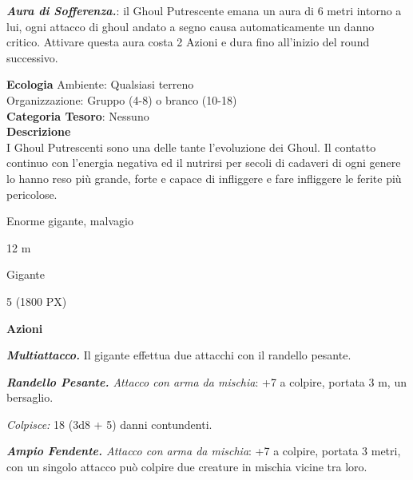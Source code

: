 \begin{multicols}{2}
{\emph{\textbf{Aura di Sofferenza.}}: il Ghoul Putrescente emana un aura di 6 metri intorno a lui, ogni attacco di ghoul andato a segno causa automaticamente un danno critico. Attivare questa aura costa 2 Azioni e dura fino all'inizio del round successivo.

\textbf{Ecologia}
Ambiente: Qualsiasi terreno\\
Organizzazione: Gruppo (4-8) o branco (10-18)\\
\textbf{Categoria Tesoro}: Nessuno\\
\textbf{Descrizione}\\
I Ghoul Putrescenti sono una delle tante l'evoluzione dei Ghoul. Il contatto continuo con l'energia negativa ed il nutrirsi per secoli di cadaveri di ogni genere lo hanno reso più grande, forte e capace di infliggere e fare infliggere le ferite più pericolose.

\begin{description}[noitemsep, topsep=0pt, parsep=0pt, partopsep=0pt, itemsep=1pt, leftmargin=2.35cm,  labelwidth=2.2cm, itemindent=0cm, listparindent=0pt] %
\setlength{\baselineskip}{10pt}
\item[\textbf{Taglia/Tipo}] Enorme gigante, malvagio
\item[\textbf{Caratt.}] 
\item[\textbf{Punti Ferita}] 
\item[\textbf{Movimento}] 12 m
\item[\textbf{Tiri Salvez.}] 
\item[\textbf{Linguaggi}] Gigante
\item[\textbf{Sfida}] 5 (1800 PX)
\end{description}
\smallskip

\textbf{Azioni}

\emph{\textbf{Multiattacco.}} Il gigante effettua due attacchi con il randello pesante.

\emph{\textbf{Randello Pesante.} Attacco con arma da mischia}: +7 a colpire, portata 3 m, un bersaglio.

\emph{Colpisce:} 18 (3d8 + 5) danni contundenti.

\emph{\textbf{Ampio Fendente.} Attacco con arma da mischia}: +7 a colpire, portata 3 metri, con un singolo attacco può colpire due creature in mischia vicine tra loro.

}
\end{multicols}
